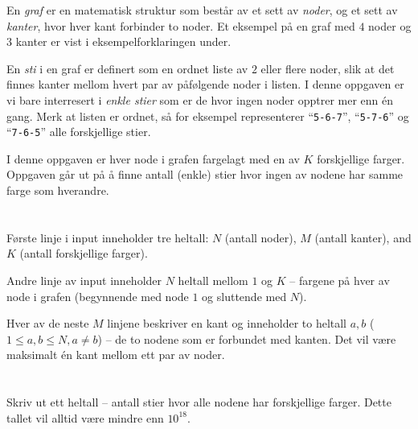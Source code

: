 \ifx\boi\undefined\fi
\def\version{jury-1}
En {\em graf} er en matematisk struktur som består av et sett av {\em noder}, og et sett av {\em kanter}, hvor hver kant forbinder to noder. Et eksempel på en graf med $4$ noder og $3$ kanter er vist i eksempelforklaringen under.

En {\em sti} i en graf er definert som en ordnet liste av $2$ eller flere noder, slik at det finnes kanter mellom
hvert par av påfølgende noder i listen. I denne oppgaven er vi bare interresert i {\em enkle stier}
som er de hvor ingen noder opptrer mer enn én gang. Merk at listen er ordnet, så for eksempel representerer
``\texttt{5-6-7}'', ``\texttt{5-7-6}'' og ``\texttt{7-6-5}'' alle forskjellige stier.


I denne oppgaven er hver node i grafen fargelagt med en av $K$ forskjellige farger. Oppgaven går ut på å finne antall
(enkle) stier hvor ingen av nodene har samme farge som hverandre.

\section*{}
Første linje i input inneholder tre heltall: $N$ (antall noder), $M$ (antall kanter), and $K$ (antall forskjellige farger).


Andre linje av input inneholder $N$ heltall mellom $1$ og $K$ -- fargene på hver av node i grafen (begynnende med node $1$ og sluttende med $N$).

Hver av de neste $M$ linjene beskriver en kant og inneholder to heltall $a, b$ ($1 \le a, b \le N, a \neq b$)
-- de to nodene som er forbundet med kanten. Det vil være maksimalt én kant mellom ett par av noder.

\section*{\outputsection}
Skriv ut ett heltall -- antall stier hvor alle nodene har forskjellige farger. Dette tallet vil alltid være mindre enn $10^{18}$.

\section*{\constraints}
\testgroups

